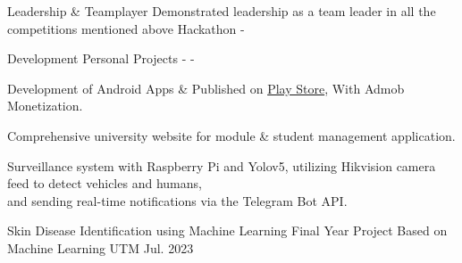 
\begin{cventries}


  \cventry
    {Leadership \& Teamplayer} %
    {Demonstrated leadership as a team leader in all the competitions mentioned above} %
    {Hackathon} %
    {-} %
    {}

  \cventry
    {Development} %
    {Personal Projects} %
    {-} %
    {-} %
    {
      \begin{cvitems} %
        \item {Development of Android Apps \& Published on \href{https://play.google.com/store/apps/developer?id=AdityaDEV}{\color{ao}Play Store}, With Admob Monetization.}
        \item {Comprehensive university website for module \& student management application.}
        \item {Surveillance system with Raspberry Pi and Yolov5, utilizing Hikvision camera feed to detect vehicles and humans,\\ and sending real-time notifications via the Telegram Bot API.}
      \end{cvitems}
    }

  \cventry
    {Skin Disease Identification using Machine Learning} %
    {Final Year Project Based on Machine Learning} %
    {UTM} %
    {Jul. 2023} %
    {}



\end{cventries}
